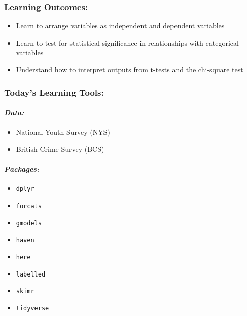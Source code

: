 \documentclass[
]{book}
\providecommand{\tightlist}{%
  \setlength{\itemsep}{0pt}\setlength{\parskip}{0pt}}
\begin{document}
\hypertarget{learning-outcomes-6}{%
\subsubsection*{Learning Outcomes:}\label{learning-outcomes-6}}

\begin{itemize}
\tightlist
\item
  Learn to arrange variables as independent and dependent variables
\item
  Learn to test for statistical significance in relationships with categorical variables
\item
  Understand how to interpret outputs from t-tests and the chi-square test
\end{itemize}

\hypertarget{todays-learning-tools-6}{%
\subsubsection*{Today's Learning Tools:}\label{todays-learning-tools-6}}

\hypertarget{data-6}{%
\paragraph*{\texorpdfstring{\emph{Data:}}{Data:}}\label{data-6}}

\begin{itemize}
\tightlist
\item
  National Youth Survey (NYS)
\item
  British Crime Survey (BCS)
\end{itemize}

\hypertarget{packages-7}{%
\paragraph*{\texorpdfstring{\emph{Packages:}}{Packages:}}\label{packages-7}}

\begin{itemize}
\tightlist
\item
  \texttt{dplyr}
\item
  \texttt{forcats}
\item
  \texttt{gmodels}
\item
  \texttt{haven}
\item
  \texttt{here}
\item
  \texttt{labelled}
\item
  \texttt{skimr}
\item
  \texttt{tidyverse}
\end{itemize}
\end{document}
